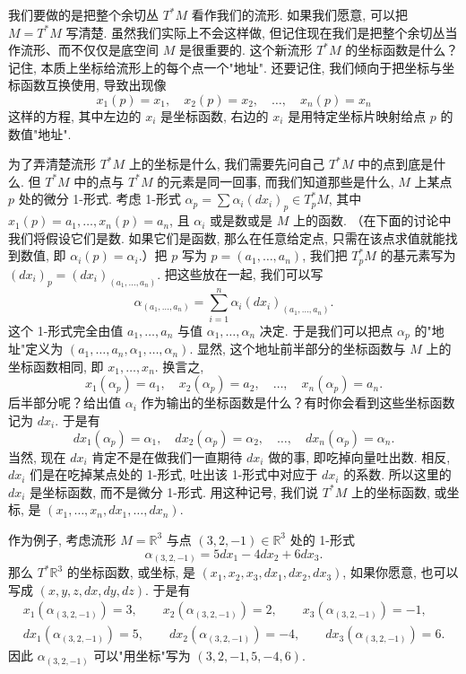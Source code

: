 我们要做的是把整个余切丛 $T^*M$ 看作我们的流形. 如果我们愿意, 可以把 $M=T^*M$ 写清楚. 虽然我们实际上不会这样做, 但记住现在我们是把整个余切丛当作流形、而不仅仅是底空间 $M$ 是很重要的. 这个新流形 $T^*M$ 的坐标函数是什么？记住, 本质上坐标给流形上的每个点一个"地址". 还要记住, 我们倾向于把坐标与坐标函数互换使用, 导致出现像
\[
x_1(p)=x_1,\quad x_2(p)=x_2,\quad\ldots,\quad x_n(p)=x_n
\]
这样的方程, 其中左边的 $x_i$ 是坐标函数, 右边的 $x_i$ 是用特定坐标片映射给点 $p$ 的数值"地址".

为了弄清楚流形 $T^*M$ 上的坐标是什么, 我们需要先问自己 $T^*M$ 中的点到底是什么. 但 $T^*M$ 中的点与 $T^*M$ 的元素是同一回事, 而我们知道那些是什么, $M$ 上某点 $p$ 处的微分 1-形式. 考虑 1-形式 $\alpha_p=\sum\alpha_i(dx_i)_p\in T_p^*M$, 其中 $x_1(p)=a_1,\ldots,x_n(p)=a_n$, 且 $\alpha_i$ 或是数或是 $M$ 上的函数. （在下面的讨论中我们将假设它们是数. 如果它们是函数, 那么在任意给定点, 只需在该点求值就能找到数值, 即 $\alpha_i(p)=\alpha_i$.）把 $p$ 写为 $p=(a_1,\ldots,a_n)$, 我们把 $T_p^*M$ 的基元素写为 $(dx_i)_p=(dx_i)_{(a_1,\ldots,a_n)}$. 把这些放在一起, 我们可以写
\[
\alpha_{(a_1,\ldots,a_n)}=\sum_{i=1}^{n}\alpha_i(dx_i)_{(a_1,\ldots,a_n)}.
\]
这个 1-形式完全由值 $a_1,\ldots,a_n$ 与值 $\alpha_1,\ldots,\alpha_n$ 决定. 于是我们可以把点 $\alpha_p$ 的"地址"定义为 $(a_1,\ldots,a_n,\alpha_1,\ldots,\alpha_n)$. 显然, 这个地址前半部分的坐标函数与 $M$ 上的坐标函数相同, 即 $x_1,\ldots,x_n$. 换言之, 
\[
x_1(\alpha_p)=a_1,\quad x_2(\alpha_p)=a_2,\quad\ldots,\quad x_n(\alpha_p)=a_n.
\]
后半部分呢？给出值 $\alpha_i$ 作为输出的坐标函数是什么？有时你会看到这些坐标函数记为 $dx_i$. 于是有
\[
dx_1(\alpha_p)=\alpha_1,\quad dx_2(\alpha_p)=\alpha_2,\quad\ldots,\quad dx_n(\alpha_p)=\alpha_n.
\]
当然, 现在 $dx_i$ 肯定不是在做我们一直期待 $dx_i$ 做的事, 即吃掉向量吐出数. 相反, $dx_i$ 们是在吃掉某点处的 1-形式, 吐出该 1-形式中对应于 $dx_i$ 的系数. 所以这里的 $dx_i$ 是坐标函数, 而不是微分 1-形式. 用这种记号, 我们说 $T^*M$ 上的坐标函数, 或坐标, 是 $(x_1,\ldots,x_n,dx_1,\ldots,dx_n)$.

作为例子, 考虑流形 $M=\mathbb{R}^3$ 与点 $(3,2,-1)\in\mathbb{R}^3$ 处的 1-形式
\[
\alpha_{(3,2,-1)}=5dx_1-4dx_2+6dx_3.
\]
那么 $T^*\mathbb{R}^3$ 的坐标函数, 或坐标, 是 $(x_1,x_2,x_3,dx_1,dx_2,dx_3)$, 如果你愿意, 也可以写成 $(x,y,z,dx,dy,dz)$. 于是有
\begin{align*}
x_1\left(\alpha_{(3,2,-1)}\right)=3,\qquad
x_2\left(\alpha_{(3,2,-1)}\right)=2,\qquad
x_3\left(\alpha_{(3,2,-1)}\right)=-1, \\
dx_1\left(\alpha_{(3,2,-1)}\right)=5,\qquad
dx_2\left(\alpha_{(3,2,-1)}\right)=-4,\qquad
dx_3\left(\alpha_{(3,2,-1)}\right)=6.
\end{align*}
因此 $\alpha_{(3,2,-1)}$ 可以"用坐标"写为 $(3,2,-1,5,-4,6)$.

